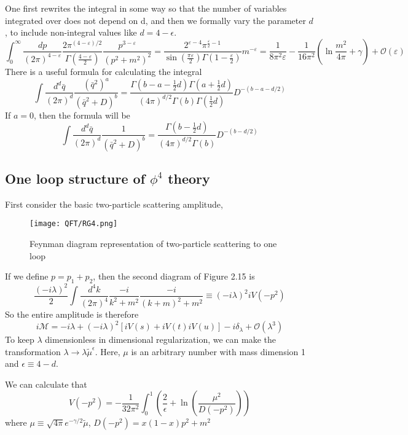One first rewrites the integral in some way so that the number of variables integrated over does not depend on d, and then we formally vary the parameter $d$, to include non-integral values like $d=4-\epsilon$.
\[\int _{0}^{\infty }{\frac {dp}{(2\pi )^{4-\varepsilon }}}{\frac {2\pi ^{(4-\varepsilon )/2}}{\Gamma \left({\frac {4-\varepsilon }{2}}\right)}}{\frac {p^{3-\varepsilon }}{\left(p^{2}+m^{2}\right)^{2}}}={\frac {2^{\varepsilon -4}\pi ^{{\frac {\varepsilon }{2}}-1}}{\sin({\frac {\pi \varepsilon }{2}})\Gamma (1-{\frac {\varepsilon }{2}})}}m^{-\varepsilon }={\frac {1}{8\pi ^{2}\varepsilon }}-{\frac {1}{16\pi ^{2}}}\left(\ln {\frac {m^{2}}{4\pi }}+\gamma \right)+{\mathcal {O}}(\varepsilon )\]
There is a useful formula for calculating the integral
\[\int \frac{d^d \bar{q}}{(2\pi)^{d}} \frac{(\bar{q}^2)^a}{(\bar{q}^2+D)^b} = \frac{\Gamma(b-a-\frac{1}{2}d) \Gamma(a+\frac{1}{2}d)}{(4\pi)^{d/2} \Gamma(b) \Gamma(\frac{1}{2}d)} D^{-(b-a-d/2)}\]
If $a=0$, then the formula will be
\[\int \frac{d^d \bar{q}}{(2\pi)^{d}} \frac{1}{(\bar{q}^2+D)^b} = \frac{\Gamma(b-\frac{1}{2}d)}{(4\pi)^{d/2} \Gamma(b)} D^{-(b-d/2)}\]

\subsection{One loop structure of $\phi^4$ theory}
First consider the basic two-particle scattering amplitude,
\begin{figure}[!h]
\centering
\texttt{[image: QFT/RG4.png]}
\caption{Feynman diagram representation of two-particle scattering to one loop}
\end{figure}
If we define $p = p_1 + p_2$, then the second diagram of Figure 2.15 is
\[\frac{(-i\lambda)^2}{2} \int \frac{d^4k}{(2\pi)^4} \frac{-i}{k^2+m^2} \frac{-i}{(k+m)^2+m^2} \equiv (-i\lambda)^2 iV(-p^2)\]
So the entire amplitude is therefore
\[i\mathcal{M} = -i\lambda + (-i\lambda)^2 [iV(s) + iV(t) iV(u)] -i\delta_{\lambda} + \mathcal{O}(\lambda^3)\]
To keep $\lambda$ dimensionless in dimensional regularization, we can make the transformation $\lambda \to \lambda \tilde{\mu}^{\epsilon}$. Here, $\mu$ is an arbitrary number with mass dimension 1 and $\epsilon \equiv 4-d$. 

We can calculate that
\[V(-p^2) = -\frac{1}{32\pi^2} \int_0^1 (\frac{2}{\epsilon} + \ln(\frac{\mu^2}{D(-p^2)}))\]
where $\mu \equiv  \sqrt{4\pi} e^{-\gamma/2} \tilde{\mu}$, $D(-p^2) = x(1-x)p^2+m^2$

